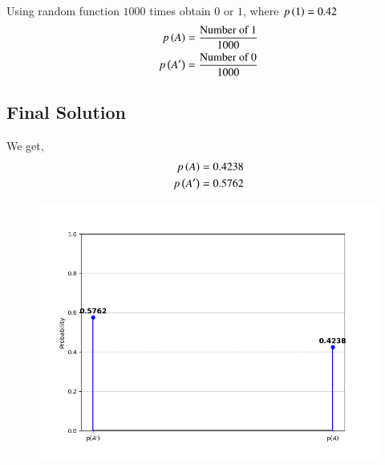 \documentclass[journal]{IEEEtran}
\begin{document}
Using random function $1000$ times obtain $0$ or $1$, where $p\left(1\right)=0.42$ 
\begin{align}
    p\left(A\right)=\frac{\text{Number of 1}}{1000}\\
        p\left(A'\right)=\frac{\text{Number of 0}}{1000}
\end{align}

	\subsection*{Final Solution}
	We get,
    \begin{align}
        p\left(A\right)=0.4238 \\
        p\left(A'\right)=0.5762
    \end{align}

\begin{figure}[h]
    \centering
    \includegraphics[width=\columnwidth]{figs/Figure_1.png}
    \label{fig:Plot}
    \end{figure}
\end{document}
